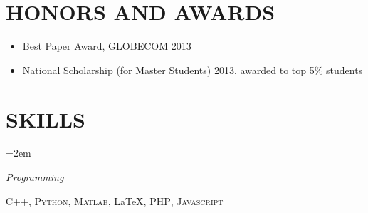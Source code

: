 \documentclass[paper=a4,fontsize=11pt]{scrartcl} %
\newlength{\spacebox}
\newcommand{\NewPart}[1]{\section*{\uppercase{#1}}}
\newcommand{\PersonalEntry}[2]{
		\noindent\hangindent=2em\hangafter=0 %
		\parbox{\spacebox}{        %
		\textit{#1}}		       %
		\hspace{1.5em} #2 \par}    %
\newcommand{\SkillsEntry}[2]{      %
		\noindent\hangindent=2em\hangafter=0 %
		\parbox{\spacebox}{        %
		\textit{#1}}			   %
		\hspace{1.5em} #2 \par}    %
\begin{document}
\NewPart{Honors and Awards}
\begin{itemize}
\item Best Paper Award, GLOBECOM 2013
\item National Scholarship (for Master Students) 2013, awarded to top 5\% students
\end{itemize}

\NewPart{Skills}{}
\SkillsEntry{Programming}{\textsc{C++}, \textsc{Python}, \textsc{Matlab}, \LaTeX, \textsc{PHP}, \textsc{Javascript}}


\end{document}
